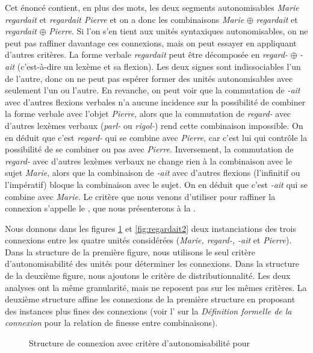Cet énoncé contient, en plus des mots, les deux segments autonomisables \textit{Marie regardait} et \textit{regardait Pierre} et on a donc les combinaisons \textit{Marie} ${\oplus}$ \textit{regardait} et \textit{regardait} ${\oplus}$ \textit{Pierre}. Si l’on s’en tient aux unités syntaxiques autonomisables, on ne peut pas raffiner davantage ces connexions, mais on peut essayer en appliquant d’autres critères. La forme verbale \textit{regardait} peut être décomposée en \textit{regard-} ${\oplus}$ \textit{{}-ait} (c’est-à-dire un lexème et sa flexion). Les deux signes sont indissociables l’un de l’autre, donc on ne peut pas espérer former des unités autonomisables avec seulement l’un ou l’autre. En revanche, on peut voir que la commutation de \textit{{}-ait} avec d’autres flexions verbales n’a aucune incidence sur la possibilité de combiner la forme verbale avec l’objet \textit{Pierre}, alors que la commutation de \textit{regard-} avec d’autres lexèmes verbaux (\textit{parl-} ou \textit{rigol-}) rend cette combinaison impossible. On en déduit que c’est \textit{regard-} qui se combine avec \textit{Pierre}, car c’est lui qui contrôle la possibilité de se combiner ou pas avec \textit{Pierre}. Inversement, la commutation de \textit{regard-} avec d’autres lexèmes verbaux ne change rien à la combinaison avec le sujet \textit{Marie}, alors que la combinaison de \textit{{}-ait} avec d’autres flexions (l’infinitif ou l’impératif) bloque la combinaison avec le sujet. On en déduit que c’est \textit{{}-ait} qui se combine avec \textit{Marie}. Le critère que nous venons d’utiliser pour raffiner la connexion s’appelle le , que nous présenterons à la .

Nous donnons dans les figures \ref{fig:regardait1} et \ref{fig:regardait2}
 deux instanciations des trois connexions entre les quatre unités considérées (\textit{Marie, regard-, -ait} et \textit{Pierre}). Dans la structure de la première figure, nous utilisons le seul critère d’autonomisabilité des unités pour déterminer les connexions. Dans la structure de la deuxième figure, nous ajoutons le critère de distributionnalité. Les deux analyses ont la même granularité, mais ne reposent pas sur les mêmes critères. La deuxième structure affine les connexions de la première structure en proposant des instances plus fines des connexions (voir l’ sur la \textit{Définition formelle de la connexion} pour la relation de finesse entre combinaisons).

\begin{figure}
\caption{Structure de connexion avec critère d’autonomisabilité pour }
\label{fig:regardait1}
\end{figure}

